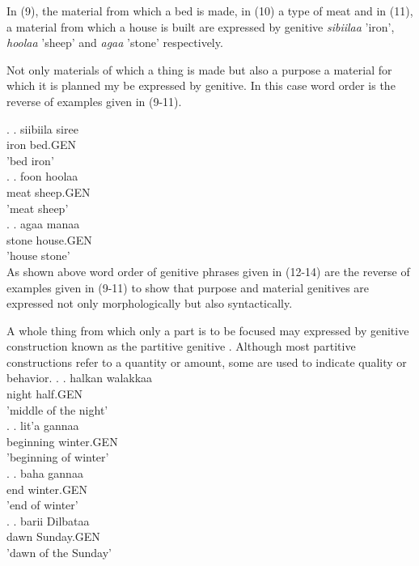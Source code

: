 \documentclass[11pt,a4paper]{article}
\begin{document}
	In (9), the material from which a bed is made, in (10) a type of meat and in (11), a material from which a house is built are expressed by genitive \emph{sibiilaa} 'iron', \emph{hoolaa} 'sheep' and \emph{agaa} 'stone' respectively.
	
	Not only materials of which a thing is made but also a purpose a material for which it is planned my be expressed by genitive. In this case word order is the reverse of examples given in (9-11).
	
	\ex.
	\ag.
	siibiila siree\\
	iron bed.GEN\\
	'bed iron'\\
	
	\ex.
	\ag.
	foon hoolaa\\
	meat sheep.GEN\\
	'meat sheep'\\
	
	\ex.
	\ag.
	agaa manaa\\
	stone house.GEN\\
	'house stone'\\
	
	As shown above word order of genitive phrases given in (12-14) are the reverse of examples given in (9-11) to show that purpose and material genitives are expressed not only morphologically but also syntactically.
	
	A whole thing from which only a part is to be focused may expressed by genitive construction known as the partitive genitive \cite[:69]{greenlee1950genitive}. Although most partitive 
	constructions refer to a quantity or amount, some are used to indicate quality or behavior.  
	\ex.
	\ag.
	halkan walakkaa\\
	night half.GEN\\
	'middle of the night'\\
	
	\ex.
	\ag.
	lit'a gannaa \\
	beginning winter.GEN\\
	'beginning of winter'\\
	
	\ex.
	\ag.
	baha gannaa\\
	end winter.GEN\\
	'end of winter'\\
	
	\ex.
	\ag.
	barii Dilbataa\\
	dawn Sunday.GEN\\
	'dawn of the Sunday'\\
	
\end{document}
